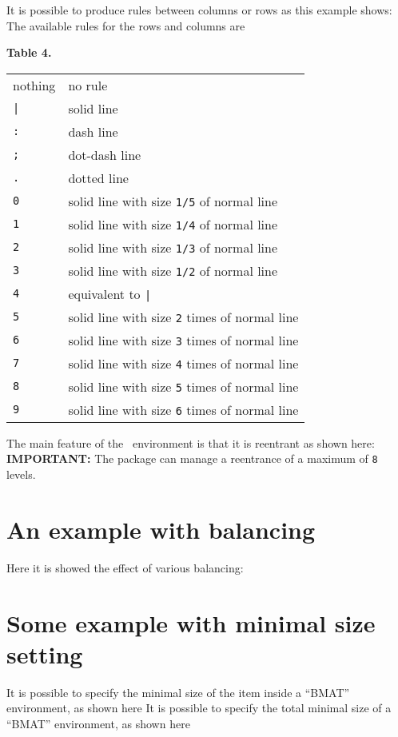 \documentclass[twoside,a4paper]{article}
\begin{document}
It is possible to produce rules between columns or rows as this
example shows:
%
%
The available rules for the rows and columns are
\begin{center}
  \par
  \textbf{Table 4.} \\[1em]
  \begin{tabular}{|l|l|}
    \hline
    nothing  & no rule \\
    \verb+|+ & solid line \\
    \verb|:| & dash line \\
    \verb|;| & dot-dash line \\
    \verb|.| & dotted line \\
    \verb|0| & solid line with size \verb|1/5| of normal line \\
    \verb|1| & solid line with size \verb|1/4| of normal line \\
    \verb|2| & solid line with size \verb|1/3| of normal line \\
    \verb|3| & solid line with size \verb|1/2| of normal line \\
    \verb|4| & equivalent to \verb+|+ \\
    \verb|5| & solid line with size \verb|2| times of normal line \\
    \verb|6| & solid line with size \verb|3| times of normal line \\
    \verb|7| & solid line with size \verb|4| times of normal line \\
    \verb|8| & solid line with size \verb|5| times of normal line \\
    \verb|9| & solid line with size \verb|6| times of normal line \\
    \hline
  \end{tabular}
  \par
\end{center}
The main feature of the ~environment
is that it is reentrant as shown here:
%
%
\textbf{IMPORTANT:} The package can manage a reentrance of a maximum 
of \verb|8| levels.


\latex{\clearpage}
\section{An example with balancing}
Here it is showed the effect of various balancing:
%
%

\latex{\clearpage}
\section{Some example with minimal size setting}
It is possible to specify the minimal size of the item inside a
``BMAT'' environment, as shown here
%
%
It is possible to specify the total minimal size of a ``BMAT''
environment, as shown here
%
%
\end{document}
